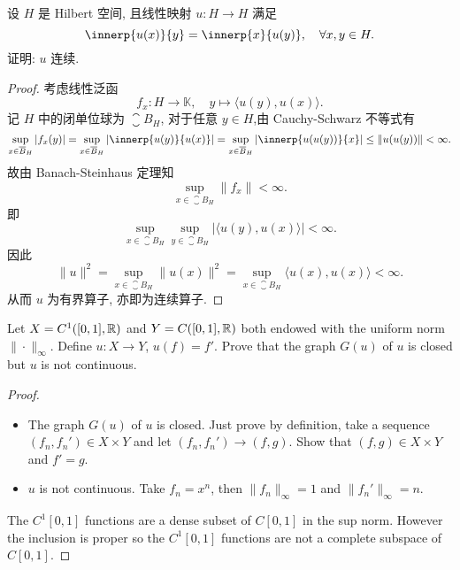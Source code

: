 \begin{exercise}
    设 $H$ 是 Hilbert 空间, 且线性映射 $u:H\to H$ 满足
    \[\innerp{u(x)}{y}=\innerp{x}{u(y)},\quad\forall x,y\in H.\]
    证明: $u$ 连续.
\end{exercise}

\begin{proof}
    考虑线性泛函
    \[f_x\colon H\to\mathbb{K},\quad y\mapsto\langle u(y),u(x)\rangle.\]
    记 $H$ 中的闭单位球为 $\closure{B}_H$, 对于任意 $y\in H$,由 Cauchy-Schwarz 不等式有
    \[\sup_{x\in\closure{B}_H}|f_x(y)|
      = \sup_{x\in\closure{B}_H}|\innerp{u(y)}{u(x)}|
      = \sup_{x\in \closure{B}_H}|\innerp{u(u(y))}{x}|\leq\|u(u(y))\|<\infty.\]
    故由 Banach-Steinhaus 定理知
    \[\sup_{x\in \closure{B}_H}\|f_x\|<\infty.\]
    即
    \[\sup_{x\in \closure{B}_H}\sup_{y\in \closure{B_H}}|\langle u(y),u(x)\rangle|<\infty.\]
    因此
    \[\|u\|^2=\sup_{x\in\closure{B}_H}\|u(x)\|^2
      = \sup_{x\in \closure{B}_H}\langle u(x),u(x)\rangle < \infty.\]
    从而 $u$ 为有界算子, 亦即为连续算子.
\end{proof}


\begin{exercise}
  Let $X = C^1([0,1],\mathbb{R})$ and $Y = C([0,1],\mathbb{R})$ both endowed with the uniform
  norm $\|\cdot\|_\infty$. Define $u:X\to Y$, $u(f) = f'$. Prove that the graph $G(u)$
  of $u$ is closed but $u$ is not continuous.
\end{exercise}

\begin{proof}
  \begin{itemize}
    \item The graph $G(u)$ of $u$ is closed. Just prove by definition,
      take a sequence $(f_n,f_n')\in X\times Y$ and let $(f_n,f_n')\to (f,g)$.
      Show that $(f,g)\in X\times Y$ and $f' = g$.
    \item $u$ is not continuous. Take $f_n = x^n$, then $\|f_n\|_\infty = 1$
      and $\|f_n'\|_\infty = n$.
  \end{itemize}
  The $C^1[0,1]$ functions are a dense subset of $C[0,1]$ in the sup norm.
  However the inclusion is proper so the $C^1[0,1]$ functions are not a complete
  subspace of $C[0,1]$.
\end{proof}


